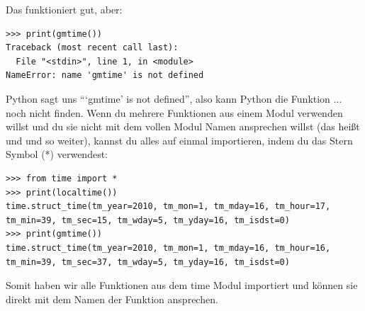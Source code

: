 \noindent
Das funktioniert gut, aber:

\begin{Verbatim}[frame=single]
>>> print(gmtime())
Traceback (most recent call last):
  File "<stdin>", line 1, in <module>
NameError: name 'gmtime' is not defined
\end{Verbatim}

Python sagt uns ```gmtime' is not defined'', also kann Python die Funktion $\ldots$ noch nicht finden. Wenn du mehrere Funktionen aus einem Modul verwenden willst und du sie nicht mit dem vollen Modul Namen ansprechen willst (das heißt  und  und so weiter), kannst du alles auf einmal importieren, indem du das Stern Symbol (*) verwendest:

\begin{Verbatim}[frame=single]
>>> from time import *
>>> print(localtime())
time.struct_time(tm_year=2010, tm_mon=1, tm_mday=16, tm_hour=17, 
tm_min=39, tm_sec=15, tm_wday=5, tm_yday=16, tm_isdst=0)
>>> print(gmtime())
time.struct_time(tm_year=2010, tm_mon=1, tm_mday=16, tm_hour=16, 
tm_min=39, tm_sec=37, tm_wday=5, tm_yday=16, tm_isdst=0)
\end{Verbatim}

Somit haben wir alle Funktionen aus dem time Modul importiert und können sie direkt mit dem Namen der Funktion ansprechen.

